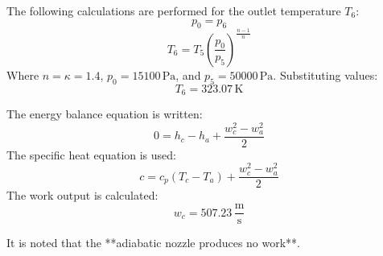 The following calculations are performed for the outlet temperature \( T_6 \):  
\[
p_0 = p_6
\]
\[
T_6 = T_5 \left( \frac{p_0}{p_5} \right)^{\frac{n-1}{n}}
\]
Where \( n = \kappa = 1.4 \), \( p_0 = 15100 \, \text{Pa} \), and \( p_5 = 50000 \, \text{Pa} \). Substituting values:  
\[
T_6 = 323.07 \, \text{K}
\]

The energy balance equation is written:  
\[
0 = h_c - h_a + \frac{w_c^2 - w_a^2}{2}
\]
The specific heat equation is used:  
\[
c = c_p (T_c - T_a) + \frac{w_c^2 - w_a^2}{2}
\]
The work output is calculated:  
\[
w_c = 507.23 \, \frac{\text{m}}{\text{s}}
\]

It is noted that the **adiabatic nozzle produces no work**.